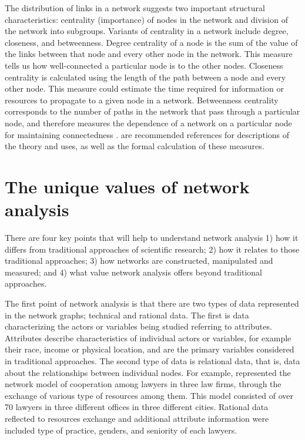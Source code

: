 \documentclass[12pt, oneside]{report}
\begin{document}
The distribution of links in a network suggests two important structural characteristics: centrality (importance) of nodes in the network and division of the network into subgroups. Variants of centrality in a network include degree, closeness, and betweenness. Degree centrality of a node is the sum of the value of the links between that node and every other node in the network. This measure tells us how well-connected a particular node is to the other nodes. Closeness centrality is calculated using the length of the path between a node and every other node. This measure could estimate the time required for information or resources to propagate to a given node in a network. Betweenness centrality corresponds to the number of paths in the network that pass through a particular node, and therefore measures the dependence of a network on a particular node for maintaining connectedness \citep{Toubiana:2013cv}. \citet{Deng:2012do, newman2003structure, Toubiana:2013cv} are recommended references for descriptions of the theory and uses, as well as the formal calculation of these measures.


\section*{The unique values of network analysis}

There are four key points that will help to understand network analysis 1) how it differs from traditional approaches of scientific research; 2) how it relates to those traditional approaches; 3) how networks are constructed, manipulated and measured; and 4) what value network analysis offers beyond traditional approaches.

The first point of network analysis is that there are two types of data represented in the network graphs; technical and rational data. The first is data characterizing the actors or variables being studied referring to attributes. Attributes describe characteristics of individual actors or variables, for example their race, income or physical location, and are the primary variables considered in traditional approaches. The second type of data is relational data, that is, data about the relationships between individual nodes. For example, \citet{Lazega} represented the network model of cooperation among lawyers in three law firms, through the exchange of various type of resources among them. This model consisted of over 70 lawyers in three different offices in three different cities. Rational data reflected to resources exchange and additional attribute information were included type of practice, genders, and seniority of each lawyers.
\end{document}
